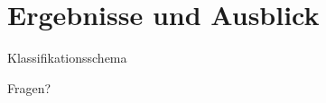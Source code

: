 \section{Ergebnisse und Ausblick}

\begin{frame}{Klassifikationsschema}
  
\end{frame}

\begin{frame}[standout]
  Fragen?
\end{frame}